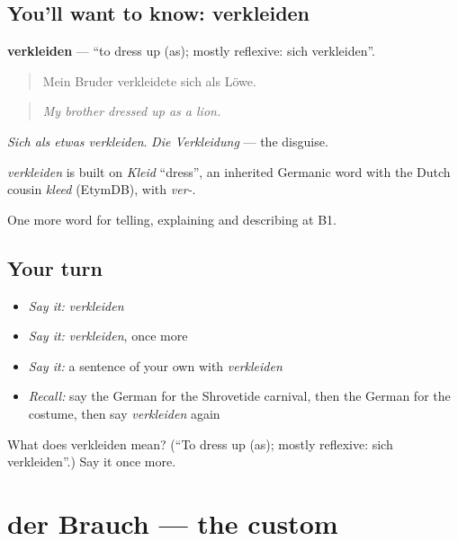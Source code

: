 \subsection*{You'll want to know: verkleiden}
\textbf{verkleiden} — \textquotedblleft{}to dress up (as); mostly reflexive: sich verkleiden\textquotedblright{}.

\begin{quote}
Mein Bruder verkleidete sich als Löwe.
\end{quote}

\begin{quote}
\emph{My brother dressed up as a lion.}
\end{quote}

\emph{Sich als etwas verkleiden}. \emph{Die Verkleidung} — the disguise.

\begin{cousinweb}
\emph{verkleiden} is built on \emph{Kleid} \textquotedblleft{}dress\textquotedblright{}, an inherited Germanic word with the Dutch cousin \emph{kleed} (EtymDB), with \emph{ver-}.
\end{cousinweb}

\begin{grammarlens}[title={What you've built}]
One more word for telling, explaining and describing at B1.
\end{grammarlens}

\subsection*{Your turn}
\begin{itemize}
\raggedright
  \item \emph{Say it:} \emph{verkleiden}
  \item \emph{Say it:} \emph{verkleiden}, once more
  \item \emph{Say it:} a sentence of your own with \emph{verkleiden}
  \item \emph{Recall:} say the German for the Shrovetide carnival, then the German for the costume, then say \emph{verkleiden} again
\end{itemize}

\begin{tcolorbox}[breakable,colback=teal!4,colframe=teal!35!black,title={Before you move on}]
What does verkleiden mean? (\textquotedblleft{}To dress up (as); mostly reflexive: sich verkleiden\textquotedblright{}.) Say it once more.
\end{tcolorbox}
\section[der Brauch]{der Brauch — the custom}

